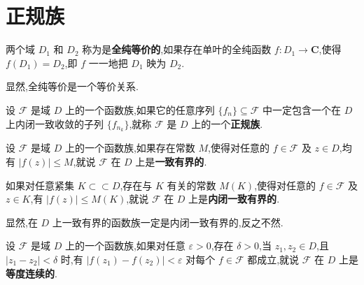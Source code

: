 \documentclass[../../main.tex]{subfiles}%
\begin{document}
\section{正规族}

\begin{definition}
两个域 \(D_1\) 和 \(D_2\) 称为是\textbf{全纯等价的},如果存在单叶的全纯函数 \(f: D_1 \to \bm{C}\),使得 \(f(D_1)=D_2\),即 \(f\) 一一地把 \(D_1\) 映为 \(D_2\). 
\end{definition}
\begin{remark}
显然,全纯等价是一个等价关系. 
\end{remark}

\begin{definition}
设 \(\mathscr{F}\) 是域 \(D\) 上的一个函数族,如果它的任意序列 \(\{f_n\} \subseteq \mathscr{F}\) 中一定包含一个在 \(D\) 上内闭一致收敛的子列 \(\{f_{n_k}\}\),就称 \(\mathscr{F}\) 是 \(D\) 上的一个\textbf{正规族}.
\end{definition}

\begin{definition}
设 \(\mathscr{F}\) 是域 \(D\) 上的一个函数族,如果存在常数 \(M\),使得对任意的 \(f \in \mathscr{F}\) 及 \(z \in D\),均有 \(|f(z)| \leqslant M\),就说 \(\mathscr{F}\) 在 \(D\) 上是\textbf{一致有界的}.

如果对任意紧集 \(K \subset \subset D\),存在与 \(K\) 有关的常数 \(M(K)\),使得对任意的 \(f \in \mathscr{F}\) 及 \(z \in K\),有 \(|f(z)| \leqslant M(K)\),就说 \(\mathscr{F}\) 在 \(D\) 上是\textbf{内闭一致有界的}. 
\end{definition}
\begin{remark}
显然,在 \(D\) 上一致有界的函数族一定是内闭一致有界的,反之不然.
\end{remark}

\begin{definition}
设 \(\mathscr{F}\) 是域 \(D\) 上的一个函数族,如果对任意 \(\varepsilon > 0\),存在 \(\delta > 0\),当 \(z_1, z_2 \in D\),且 \(|z_1 - z_2| < \delta\) 时,有 \(|f(z_1) - f(z_2)| < \varepsilon\) 对每个 \(f \in \mathscr{F}\) 都成立,就说 \(\mathscr{F}\) 在 \(D\) 上是\textbf{等度连续的}.
\end{definition}
\end{document}
